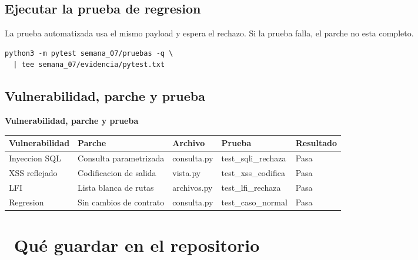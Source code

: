 \documentclass[11pt,a4paper]{article}
\newcommand{\iconotexto}[2]{\textcolor{cyanNeon}{\faIcon{#1}}~#2}
\begin{document}
\subsection{Ejecutar la prueba de regresion}

La prueba automatizada usa el mismo payload y espera el rechazo. Si la prueba falla, el parche no esta completo.

\begin{lstlisting}[style=estiloCodigo]
python3 -m pytest semana_07/pruebas -q \
  | tee semana_07/evidencia/pytest.txt
\end{lstlisting}

\subsection{Vulnerabilidad, parche y prueba}

\begin{center}
\begin{minipage}{\linewidth}
\centering
{\footnotesize
\textbf{Vulnerabilidad, parche y prueba}\par\smallskip
\begin{tabular}{@{}>{\raggedright\arraybackslash}p{2.40cm}>{\raggedright\arraybackslash}p{3.40cm}>{\raggedright\arraybackslash}p{2.60cm}>{\raggedright\arraybackslash}p{3.00cm}>{\raggedright\arraybackslash}p{2.20cm}@{}}
\toprule
\textbf{Vulnerabilidad} & \textbf{Parche} & \textbf{Archivo} & \textbf{Prueba} & \textbf{Resultado} \\
\midrule
Inyeccion SQL & Consulta parametrizada & consulta.py & test\_sqli\_rechaza & Pasa \\
XSS reflejado & Codificacion de salida & vista.py & test\_xss\_codifica & Pasa \\
LFI & Lista blanca de rutas & archivos.py & test\_lfi\_rechaza & Pasa \\
Regresion & Sin cambios de contrato & consulta.py & test\_caso\_normal & Pasa \\
\bottomrule
\end{tabular}
}
\par{}
\end{minipage}
\end{center}

\section{\iconotexto{box-open}{Qué guardar en el repositorio}}
\end{document}
